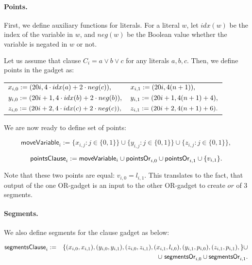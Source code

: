 \paragraph{Points.}

\newcommand{\pointsClause}[1]{\mathsf{pointsClause}_{#1}}


First, we define auxiliary functions for literals. 
For a literal $w$, let $idx(w)$ be the index of the variable in $w$,
and $neg(w)$ be the Boolean value whether the variable is negated in $w$
or not.

Let us assume that clause $C_i = a \lor b \lor c$
for any literals $a,b,c$. Then, we define points in the gadget as:

\begin{center}
\begin{tabular}{ l l }
	$x_{i, 0} := (20 i, 4\cdot idx(a) + 2\cdot neg(c)),$ &
	$x_{i, 1} := (20 i, 4(n+1)),$ \\
	$y_{i, 0} := (20 i+1, 4\cdot idx(b) + 2\cdot neg(b)),$ &
	$y_{i, 1} := (20 i+1, 4(n+1) + 4),$ \\
	$z_{i, 0} := (20 i+2, 4\cdot idx(c) + 2\cdot neg(c)),$ &
	$z_{i, 1} := (20 i+2, 4(n+1) + 6).$
\end{tabular}
\end{center}

\newcommand{\segmentsClause}{\mathsf{segmentsClause}}	
 
We are now ready to define set of points:
 
 $$\mathsf{moveVariable}_i := 
 \{x_{i, j} : j \in \{0, 1\}\} \cup
 \{y_{i, j} : j \in \{0, 1\}\} \cup
 \{z_{i, j} : j \in \{0, 1\}\},
 $$
 
 $$\pointsClause{i} := 
 \mathsf{moveVariable}_i \cup \pointsOr{i}{0}
 \cup \pointsOr{i}{1} \cup \{v_{i, 1} \}.
 $$
 
Note that these two points are equal: $v_{i,0} = l_{i,1}$.
This translates to the fact, that output of the one OR-gadget
is an input to the other OR-gadget to create $or$ of 3 segments.

\paragraph{Segments.}
We also define segments for the clause gadget as below:

\begin{eqnarray*}
\segmentsClause_i & := & \{ (x_{i, 0}, x_{i, 1}),
(y_{i, 0}, y_{i, 1}),
(z_{i, 0}, z_{i, 1}),
(x_{i, 1}, l_{i, 0}),
(y_{i, 1}, p_{i, 0}),
(z_{i, 1}, p_{i, 1}),
\} \cup \\
& & \cup \ \segmentsOr{i}{0} \cup \segmentsOr{i}{1}.
\end{eqnarray*}

